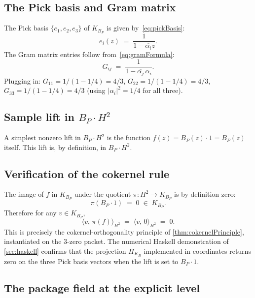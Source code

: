 \documentclass[12pt]{article}
\theoremstyle{definition}
\theoremstyle{remark}
\newcommand{\HardyTwo}{H^{2}}
\newcommand{\KB}{K_{B}}
\newcommand{\KBP}{K_{B_{P}}}
\newcommand{\inn}[2]{\langle #1,\, #2 \rangle}
\newcommand{\PK}{\Pi_{\KB}}
\begin{document}
\subsection{The Pick basis and Gram matrix}

The Pick basis $\{e_{1}, e_{2}, e_{3}\}$ of $\KBP$ is given by~\eqref{eq:pickBasis}:
\begin{equation}\label{eq:explicitPickBasis}
  e_{i}(z) \;=\; \frac{1}{1 - \overline{\alpha_{i}} z}.
\end{equation}
The Gram matrix entries follow from~\eqref{eq:gramFormula}:
\begin{equation}\label{eq:explicitGram}
  G_{ij}
  \;=\;
  \frac{1}{1 - \overline{\alpha_{j}}\, \alpha_{i}}.
\end{equation}
Plugging in: $G_{11} = 1/(1 - 1/4) = 4/3$, $G_{22} = 1/(1 - 1/4) = 4/3$, $G_{33} = 1/(1 - 1/4) = 4/3$ (using $|\alpha_{i}|^{2} = 1/4$ for all three).

\subsection{Sample lift in $B_{P} \cdot \HardyTwo$}

A simplest nonzero lift in $B_{P} \cdot \HardyTwo$ is the function $f(z) = B_{P}(z) \cdot 1 = B_{P}(z)$ itself. This lift is, by definition, in $B_{P} \cdot \HardyTwo$.

\subsection{Verification of the cokernel rule}

The image of $f$ in $\KBP$ under the quotient $\pi : \HardyTwo \to \KBP$ is by definition zero:
\begin{equation}\label{eq:explicitProj}
  \pi(B_{P} \cdot 1) \;=\; 0 \;\in\; \KBP.
\end{equation}
Therefore for any $v \in \KBP$,
\begin{equation}\label{eq:explicitOrth}
  \inn{v}{\pi(f)}_{H^{2}} \;=\; \inn{v}{0}_{H^{2}} \;=\; 0.
\end{equation}
This is precisely the cokernel-orthogonality principle of \cref{thm:cokernelPrinciple}, instantiated on the 3-zero packet. The numerical Haskell demonstration of \cref{sec:haskell} confirms that the projection $\PK$ implemented in coordinates returns zero on the three Pick basis vectors when the lift is set to $B_{P} \cdot 1$.

\subsection{The package field at the explicit level}
\end{document}
